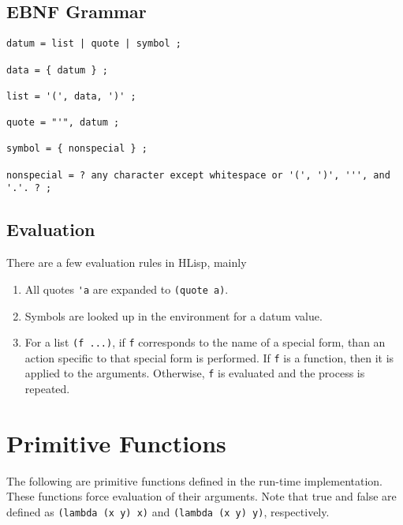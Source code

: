 \documentclass[12pt]{article}
\begin{document}
\subsection{EBNF Grammar}

\begin{verbatim}
datum = list | quote | symbol ;

data = { datum } ;

list = '(', data, ')' ;

quote = "'", datum ;

symbol = { nonspecial } ;

nonspecial = ? any character except whitespace or '(', ')', ''', and '.'. ? ;
\end{verbatim}

\subsection{Evaluation}

There are a few evaluation rules in HLisp, mainly

\begin{enumerate}
\item All quotes \verb!'a! are expanded to \verb!(quote a)!.

\item Symbols are looked up in the environment for a datum value.

\item For a list \verb!(f ...)!, if \verb!f! corresponds to the name of a
  special form, than an action specific to that special form is performed. If
  \verb!f! is a function, then it is applied to the arguments. Otherwise,
  \verb!f! is evaluated and the process is repeated.
\end{enumerate}

\section{Primitive Functions}

The following are primitive functions defined in the run-time implementation.
These functions force evaluation of their arguments. Note that true and false
are defined as \verb!(lambda (x y) x)! and \verb!(lambda (x y) y)!,
respectively.
\end{document}

